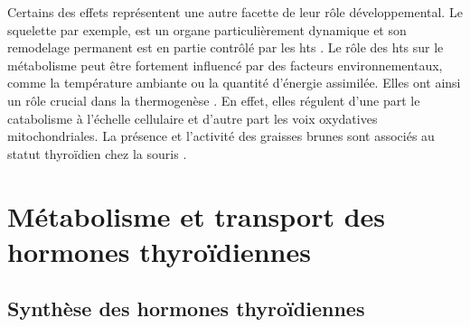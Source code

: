 \documentclass[../main.tex]{subfiles}
\begin{document}
	Certains des effets représentent une autre facette de leur rôle développemental.
	Le squelette par exemple, est un organe particulièrement dynamique et son remodelage permanent est en partie contrôlé par les \glspl{ht} \citep{Greenspan1999,Wojcicka2013a}.
	Le rôle des \glspl{ht} sur le métabolisme peut être fortement influencé par des facteurs environnementaux, comme la température ambiante ou la quantité d'énergie assimilée.
	Elles ont ainsi un rôle crucial dans la thermogenèse \citep{Bianco2005}.
	En effet, elles régulent d'une part le catabolisme à l'échelle cellulaire et d'autre part les voix oxydatives mitochondriales. La présence et l'activité des graisses brunes sont associés au statut thyroïdien chez la souris \citep{Bianco2005}.

	




\section{Métabolisme et transport des hormones thyroïdiennes}\label{subsec:ht-metabolism}


	\subsection{Synthèse des hormones thyroïdiennes}
\end{document}
